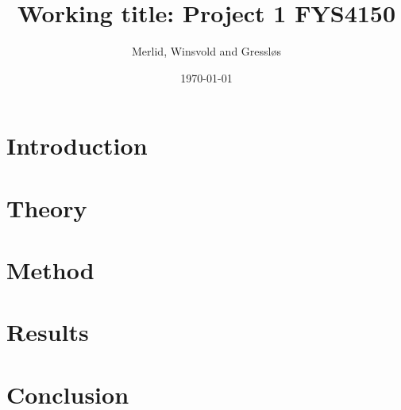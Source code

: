 \documentclass[aps,rmp,reprint,amsmath,amssymb,longbibliography,twocolumn,floatfix]{revtex4-1}
\begin{document}
\title{Working title: Project 1 FYS4150}

\author{Merlid, Winsvold and Gressløs}
\date{\today}


\begin{abstract}

\end{abstract}

\maketitle

\tableofcontents

\section{Introduction}
\label{sec:introduction}

\section{Theory}
\label{sec:theory}

\section{Method}
\label{sec:method}

\section{Results}
\label{sec:results}

\section{Conclusion}
\label{sec:conclusion}

\newpage

\appendix

\end{document}
